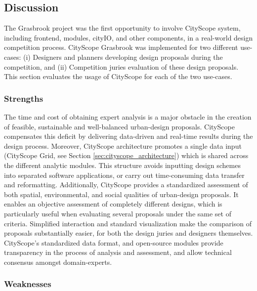 {    \subsection{Discussion}
    {
        The Grasbrook project was the first opportunity to involve CityScope system, including frontend, modules, cityIO, and other components, in a real-world design competition process.
        CityScope Grasbrook was implemented for two different use-cases: (i) Designers and planners developing design proposals during the competition, and (ii) Competition juries evaluation of these design proposals. This section evaluates the usage of CityScope for each of the two use-cases.

        \subsubsection{Strengths}
        {
            The time and cost of obtaining expert analysis is a major obstacle in the creation of feasible, sustainable and well-balanced urban-design proposals. CityScope compensates this deficit by delivering data-driven and real-time results during the design process. Moreover, CityScope architecture promotes a single data input (CityScope Grid, see Section \eqref{sec:cityscope_architecture}) which is shared across the different analytic modules. This structure avoids inputting design schemes into separated software applications, or carry out time-consuming data transfer and reformatting.
            \newline
            Additionally, CityScope provides a standardized assessment of both spatial, environmental, and social qualities of urban-design proposals. It enables an objective assessment of completely different designs, which is particularly useful when evaluating several proposals under the same set of criteria. Simplified interaction and standard visualization make the comparison of proposals substantially easier, for both the design juries and designers themselves. CityScope's standardized data format, and open-source modules provide transparency in the process of analysis and assessment, and allow technical consensus amongst domain-experts.
        }

        \subsubsection{Weaknesses}

}}
